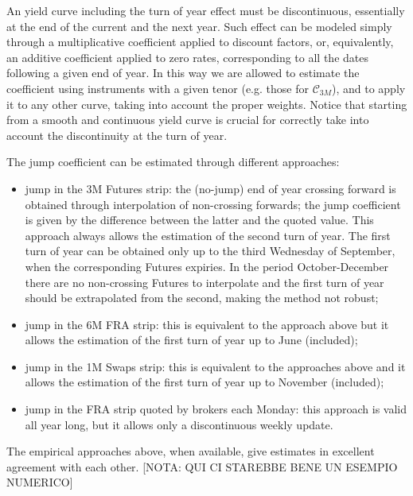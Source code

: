 \documentclass[11pt,reqno]{amsart}
\begin{document}
An yield curve including the turn of year effect must be discontinuous, essentially at the end of the current and the next year.
Such effect can be modeled simply through a multiplicative coefficient applied to discount factors, or, equivalently, an additive coefficient applied to zero rates, corresponding to all the dates following a given end of year.
In this way we are allowed to estimate the coefficient using instruments with a given tenor (e.g. those for $\mathcal C_{3M}$), and to apply it to any other curve, taking into account the proper weights.
Notice that starting from a smooth and continuous yield curve is crucial for correctly take into account the discontinuity at the turn of year.
\par
The jump coefficient can be estimated through different approaches:
\begin{itemize}
  \item jump in the 3M Futures strip: the (no-jump) end of year crossing forward is obtained through interpolation of non-crossing forwards; the jump coefficient is given by the difference between the latter and the quoted value. This approach always allows the estimation of the second turn of year. The first turn of year can be obtained only up to the third Wednesday of September, when the corresponding Futures expiries. In the period October-December there are no non-crossing Futures to interpolate and the first turn of year should be extrapolated from the second, making the method not robust;
  \item jump in the 6M FRA strip: this is equivalent to the approach above but it allows the estimation of the first turn of year up to June (included);
  \item jump in the 1M Swaps strip: this is equivalent to the approaches above and it allows the estimation of the first turn of year up to November (included);
  \item jump in the FRA strip quoted by brokers each Monday: this approach is valid all year long, but it allows only a discontinuous weekly update.
\end{itemize}
The empirical approaches above, when available, give estimates in excellent agreement with each other.
[NOTA: QUI CI STAREBBE BENE UN ESEMPIO NUMERICO]
\end{document}
